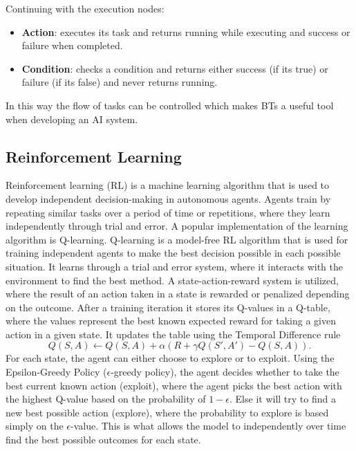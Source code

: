 Continuing with the execution nodes:
\begin{itemize}
    \item \textbf{Action}: executes its task and returns running while executing and success or failure when completed.
    \item \textbf{Condition}: checks a condition and returns either success (if its true) or failure (if its false) and never returns running. 
\end{itemize} 
In this way the flow of tasks can be controlled which makes BTs a useful tool when developing an AI system\cite{BTsinAI}. 

\subsection{Reinforcement Learning}
Reinforcement learning (RL) is a machine learning
algorithm that is used to develop independent decision-making in autonomous agents.
Agents train by repeating similar tasks over a period of time or repetitions, where they
learn independently through trial and error. A popular implementation of the learning
algorithm is Q-learning\cite{JacobMurel1RL}. Q-learning is a model-free RL
algorithm that is used for training independent agents to make the best decision
possible in each possible situation. It learns through a trial and error system, where it
interacts with the environment to find the best method. A state-action-reward system is
utilized, where the result of an action taken in a state is rewarded or penalized
depending on the outcome. After a training iteration it stores its Q-values in a Q-table,
where the values represent the best known expected reward for taking a given action in
a given state. It updates the table using the Temporal Difference rule
\[
Q(S, A) \leftarrow Q(S, A) + \alpha \left( R + \gamma Q(S', A') - Q(S, A) \right).
\]
For each state, the agent can either choose to
explore or to exploit. Using the Epsilon-Greedy Policy (\(\epsilon\)-greedy policy), the agent
decides whether to take the best current known action (exploit), where the agent picks
the best action with the highest Q-value based on the probability of \(1-\epsilon\). Else it will try to
find a new best possible action (explore), where the probability to explore is based
simply on the \(\epsilon\)-value. This is what allows the model to independently over time find the
best possible outcomes for each state\cite{GeeksForGeeks1RL}.

